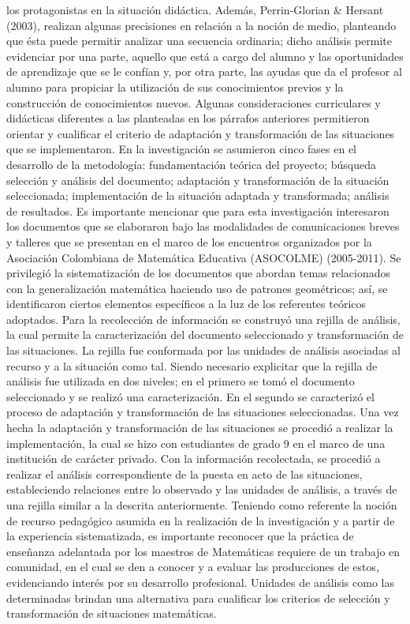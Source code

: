 los protagonistas en la situación didáctica. Además, Perrin-Glorian
\& Hersant (2003), realizan algunas precisiones en relación a la noción
de medio, planteando que ésta puede permitir analizar una secuencia
ordinaria; dicho análisis permite evidenciar por una parte, aquello
que está a cargo del alumno y las oportunidades de aprendizaje que
se le confían y, por otra parte, las ayudas que da el profesor al
alumno para propiciar la utilización de sus conocimientos previos
y la construcción de conocimientos nuevos. Algunas consideraciones
curriculares y didácticas diferentes a las planteadas en los párrafos
anteriores permitieron orientar y cualificar el criterio de adaptación
y transformación de las situaciones que se implementaron. En la investigación
se asumieron cinco fases en el desarrollo de la metodología: fundamentación
teórica del proyecto; búsqueda selección y análisis del documento;
adaptación y transformación de la situación seleccionada; implementación
de la situación adaptada y transformada; análisis de resultados. Es
importante mencionar que para esta investigación interesaron los documentos
que se elaboraron bajo las modalidades de comunicaciones breves y
talleres que se presentan en el marco de los encuentros organizados
por la Asociación Colombiana de Matemática Educativa (ASOCOLME) (2005-2011).
Se privilegió la sistematización de los documentos que abordan temas
relacionados con la generalización matemática haciendo uso de patrones
geométricos; así, se identificaron ciertos elementos específicos a
la luz de los referentes teóricos adoptados. Para la recolección de
información se construyó una rejilla de análisis, la cual permite
la caracterización del documento seleccionado y transformación de
las situaciones. La rejilla fue conformada por las unidades de análisis
asociadas al recurso y a la situación como tal. Siendo necesario explicitar
que la rejilla de análisis fue utilizada en dos niveles; en el primero
se tomó el documento seleccionado y se realizó una caracterización.
En el segundo se caracterizó el proceso de adaptación y transformación
de las situaciones seleccionadas. Una vez hecha la adaptación y transformación
de las situaciones se procedió a realizar la implementación, la cual
se hizo con estudiantes de grado 9\textdegree{} en el marco de una
institución de carácter privado. Con la información recolectada, se
procedió a realizar el análisis correspondiente de la puesta en acto
de las situaciones, estableciendo relaciones entre lo observado y
las unidades de análisis, a través de una rejilla similar a la descrita
anteriormente. Teniendo como referente la noción de recurso pedagógico
asumida en la realización de la investigación y a partir de la experiencia
sistematizada, es importante reconocer que la práctica de enseñanza
adelantada por los maestros de Matemáticas requiere de un trabajo
en comunidad, en el cual se den a conocer y a evaluar las producciones
de estos, evidenciando interés por su desarrollo profesional. Unidades
de análisis como las determinadas brindan una alternativa para cualificar
los criterios de selección y transformación de situaciones matemáticas. 


